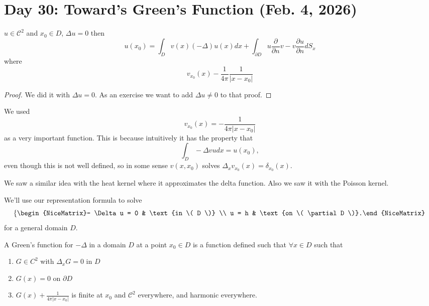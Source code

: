 \section{Day 30: Toward's Green's Function (Feb. 4, 2026)}

\begin{lemma}
		\( u \in \mathcal{C}^{2} \) and \( x_{0} \in D \), \( \Delta u = 0 \) then
	\[ u(x_{0}) = \int_{D} v(x) (- \Delta) u(x) dx + \int_{\partial D}  u \frac{\partial}{\partial n} v - v \frac{\partial u}{\partial n} dS_{x} \]
	where
	\[ v_{x_{0}}(x) - \frac{1}{4 \pi} \frac{1}{|x - x_{0}|} \]
\end{lemma}
\begin{proof}
	We did it with \( \Delta u = 0 \). As an exercise we want to add \( \Delta u \ne 0 \) to that proof.
\end{proof}

We used \[ v_{x_{0}}(x) = -\frac{1}{4 \pi |x - x_{0}|} \]
as a very important function. This is because intuitively it has the property that
\[ \int_{D} - \Delta v u dx = u(x_{0}), \]
even though this is not well defined, so in some sense \( v(x, x_{0}) \) solves \( \Delta_{x} v_{x_{0}}(x) = \delta_{x_{0}}(x) \). 

\begin{remark}
	We saw a similar idea with the heat kernel where it approximates the delta function. Also we saw it with the Poisson kernel.
\end{remark}

We'll use our representation formula to solve
\[ \left\{\begin{NiceMatrix}- \Delta u = 0 & \text{in \( D \)} \\ u = h & \text{on \( \partial D \)}.\end{NiceMatrix}\right.  \]
for a general domain \( D \).

\begin{definition}
	A Green's function for \( - \Delta \) in a domain \( D \) at a point \( x_{0} \in D \) is a function defined such that \( \forall x \in D \) such that
	\begin{enumerate}
	
		\item \( G \in C^{2} \) with \( \Delta_{x} G = 0 \) in \( D \)
		\item \( G(x) = 0 \) on \( \partial D \)
		\item \( G(x) + \frac{1}{4 \pi |x - x_{0}|}\) is finite at \( x_{0} \) and \( \mathcal{C}^{2} \) everywhere, and harmonic everywhere.
	
	\end{enumerate}

\end{definition}

